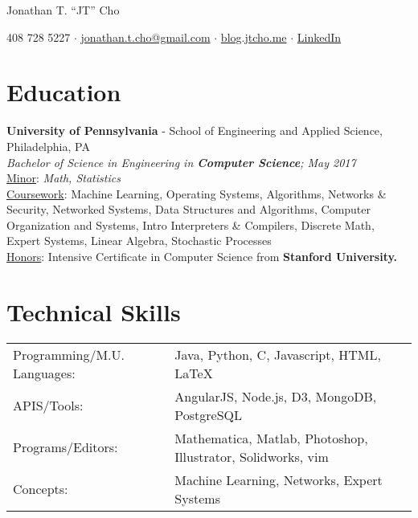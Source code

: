 \documentclass{resume}[10pt, a4paper]
\begin{document}
\begin{center}
    \huge Jonathan T. ``JT'' Cho
\end{center}


\begin{center}
    \large 408 728 5227 $\cdot$ \href{mailto:jonathan.t.cho@gmail.com}{jonathan.t.cho@gmail.com} $\cdot$ \href{http://blog.jtcho.me}{blog.jtcho.me} $\cdot$ \href{https://www.linkedin.com/in/jtcho}{LinkedIn}
\end{center}

\section{Education}
\textbf{University of Pennsylvania} - School of Engineering and Applied Science, Philadelphia, PA\\
\textit{Bachelor of Science in Engineering in \textbf{Computer Science}; May 2017}\\
\ul{Minor}: \textit{Math, Statistics}\\
\ul{Coursework}:
Machine Learning, Operating Systems, Algorithms, Networks \& Security, Networked Systems, Data Structures and Algorithms, Computer Organization and Systems, Intro Interpreters \& Compilers, Discrete Math, Expert Systems, Linear Algebra, Stochastic Processes\\
\ul{Honors}: Intensive Certificate in Computer Science from \textbf{Stanford University.}

\section{Technical Skills}
\begin{tabular}{l l}
    Programming/M.U. Languages:&Java, Python, C, Javascript, HTML, \LaTeX\\
               APIS/Tools:&AngularJS, Node.js, D3, MongoDB, PostgreSQL\\
         Programs/Editors:&Mathematica, Matlab, Photoshop, Illustrator, Solidworks, vim\\
                 Concepts:&Machine Learning, Networks, Expert Systems
\end{tabular}
\end{document}
